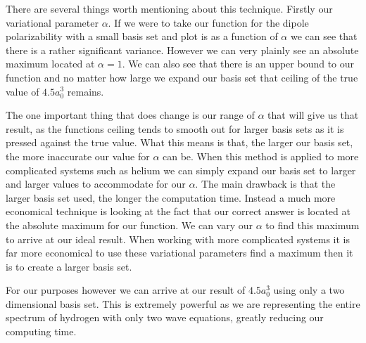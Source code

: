 There are several things worth mentioning about this technique. Firstly our variational parameter \(\alpha\). If we were to take our function for the dipole polarizability with a small basis set and plot is as a function of \(\alpha\) we can see that there is a rather significant variance. However we can very plainly see an absolute maximum located at \(\alpha=1\)\cite{variational}.  We can also see that there is an upper bound to our function and no matter how large we expand our basis set that ceiling of the true value of \(4.5a_{0}^{3}\) remains.

The one important thing that does change is our range of \(\alpha\) that will give us that result, as the functions ceiling tends to smooth out for larger basis sets as it is pressed against the true value. What this means is that, the larger our basis set, the more inaccurate our value for \(\alpha\) can be. When this method is applied to more complicated systems such as helium we can simply expand our basis set to larger and larger values to accommodate for our \(\alpha\). The main drawback is that the larger basis set used, the longer the computation time. Instead a much more economical technique is looking at the fact that our correct answer is located at the absolute maximum for our function. We can vary our \(\alpha\) to find this maximum to arrive at our ideal result. When working with more complicated systems it is far more economical to use these variational parameters find a maximum then it is to create a larger basis set.

For our purposes however we can arrive at our result of \(4.5a_{0}^{3}\) using only a two dimensional basis set\cite{variational}. This is extremely powerful as we are representing the entire spectrum of hydrogen with only two wave equations, greatly reducing our computing time.



